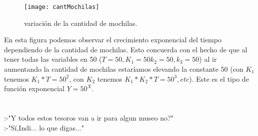 \documentclass[spanish,12pt]{article}
\begin{document}
\begin{figure}[H]
\centering
\texttt{[image: cantMochilas]}
\caption{variación de la cantidad de mochilas.}
\end{figure}

En esta figura podemos observar el crecimiento exponencial del tiempo dependiendo de la cantidad de mochilas. Esto concuerda con el hecho de que al tener todas las variables en 50 ($T=50, K_1 =50 k_2=50, k_3=50$) al ir aumentando la cantidad de mochilas estaríamos elevando la constante 50 (con $K_1$ tenemos $K_1*T=50^2$, con $K_2$ tenemos $K_1*K_2*T=50^3, etc $). Este es el tipo de función exponencial $Y=50^X$.
\\
\\
\\






:-"Y todos estos tesoros van a ir para algun museo no?"
\\
:-"Sí,Indi... lo que digas..."
\end{document}
